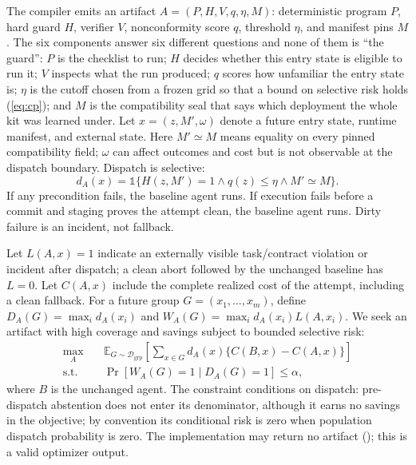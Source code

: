 The compiler emits an artifact $A=(P,H,V,q,\eta,M)$: deterministic program $P$, hard
guard $H$, verifier $V$, nonconformity score $q$, threshold $\eta$, and manifest pins $M$.
The six components answer six different questions and none of them is ``the guard'':
$P$ is the checklist to run; $H$ decides whether this entry state is eligible to run it;
$V$ inspects what the run produced; $q$ scores how unfamiliar the entry state is; $\eta$
is the cutoff chosen from a frozen grid so that a bound on selective risk holds
(\cref{eq:cp}); and $M$ is the compatibility seal that says which deployment the whole kit
was learned under.  Let $x=(z,M',\omega)$ denote a future entry state, runtime manifest,
and external state.  Here $M'\simeq M$ means equality on every pinned compatibility field;
$\omega$ can affect outcomes and cost but is not observable at the dispatch boundary.
Dispatch is selective:
\begin{equation}
  d_A(x)=\mathbb{1}\{H(z,M')=1 \land q(z)\leq\eta \land M'\simeq M\}.
  \label{eq:dispatch}
\end{equation}
If any precondition fails, the baseline agent runs.  If execution fails before a
commit and staging proves the attempt clean, the baseline agent runs.  Dirty failure is
an incident, not fallback.

Let $L(A,x)=1$ indicate an externally visible task/contract violation or incident after
dispatch; a clean abort followed by the unchanged baseline has $L=0$.  Let $C(A,x)$ include
the complete realized cost of the attempt, including a clean fallback.  For a future group
$G=(x_1,\ldots,x_m)$, define $D_A(G)=\max_i d_A(x_i)$ and
$W_A(G)=\max_i d_A(x_i)L(A,x_i)$.  We seek an artifact with high coverage and savings
subject to bounded selective risk:
\begin{align}
  \max_A\quad & \mathbb{E}_{G\sim\mathcal{D}_{\mathrm{grp}}}\!\left[\sum_{x\in G}d_A(x)\{C(B,x)-C(A,x)\}\right] \\
  \text{s.t.}\quad & \Pr[W_A(G)=1\mid D_A(G)=1]\leq\alpha,
  \label{eq:objective}
\end{align}
where $B$ is the unchanged agent.  The constraint conditions on dispatch: pre-dispatch abstention does
not enter its denominator, although it earns no savings in the objective; by convention
its conditional risk is zero when population dispatch probability is zero.  The
implementation may return no artifact (\retire); this is a valid optimizer output.

